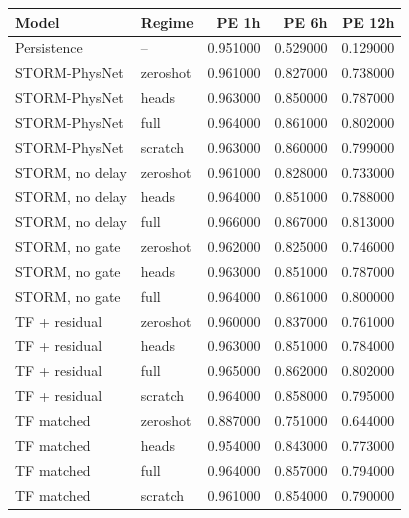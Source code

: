 \begin{tabular}{llrrr}
\toprule
Model & Regime & PE 1h & PE 6h & PE 12h \\
\midrule
Persistence & -- & 0.951000 & 0.529000 & 0.129000 \\
STORM-PhysNet & zeroshot & 0.961000 & 0.827000 & 0.738000 \\
STORM-PhysNet & heads & 0.963000 & 0.850000 & 0.787000 \\
STORM-PhysNet & full & 0.964000 & 0.861000 & 0.802000 \\
STORM-PhysNet & scratch & 0.963000 & 0.860000 & 0.799000 \\
STORM, no delay & zeroshot & 0.961000 & 0.828000 & 0.733000 \\
STORM, no delay & heads & 0.964000 & 0.851000 & 0.788000 \\
STORM, no delay & full & 0.966000 & 0.867000 & 0.813000 \\
STORM, no gate & zeroshot & 0.962000 & 0.825000 & 0.746000 \\
STORM, no gate & heads & 0.963000 & 0.851000 & 0.787000 \\
STORM, no gate & full & 0.964000 & 0.861000 & 0.800000 \\
TF + residual & zeroshot & 0.960000 & 0.837000 & 0.761000 \\
TF + residual & heads & 0.963000 & 0.851000 & 0.784000 \\
TF + residual & full & 0.965000 & 0.862000 & 0.802000 \\
TF + residual & scratch & 0.964000 & 0.858000 & 0.795000 \\
TF matched & zeroshot & 0.887000 & 0.751000 & 0.644000 \\
TF matched & heads & 0.954000 & 0.843000 & 0.773000 \\
TF matched & full & 0.964000 & 0.857000 & 0.794000 \\
TF matched & scratch & 0.961000 & 0.854000 & 0.790000 \\
\bottomrule
\end{tabular}
